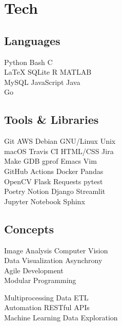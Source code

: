 \documentclass[]{jidicula-resume}
\begin{document}
\section{Tech}
\begin{minipage}[t]{.32\textwidth}
  \subsection{Languages}
  Python \textbullet{} Bash \textbullet{} C \\
  \LaTeX{} \textbullet{} SQLite \textbullet{} R \textbullet{} MATLAB  \\
  MySQL \textbullet{} JavaScript \textbullet{} Java \\
  Go
  \sectionsep{}
\end{minipage}
\hfill
\begin{minipage}[t]{.32\textwidth}
  \subsection{Tools \& Libraries}
  Git \textbullet{} AWS \textbullet{} {Debian GNU/Linux} \textbullet{} Unix \\
  macOS \textbullet{} Travis CI \textbullet{} HTML/CSS \textbullet{} Jira \\
  Make \textbullet{} GDB \textbullet{} gprof \textbullet{} Emacs \textbullet{} Vim \\
  GitHub Actions \textbullet{} Docker \textbullet{} Pandas \\
  OpenCV \textbullet{} Flask \textbullet{} Requests \textbullet{} pytest \\
  Poetry \textbullet{} Notion \textbullet{} Django \textbullet{} Streamlit \\
  Jupyter Notebook \textbullet{} Sphinx
  \sectionsep{}
\end{minipage}
\hfill
\begin{minipage}[t]{.32\textwidth}
  \subsection{Concepts}
  Image Analysis \textbullet{} Computer Vision \\
  Data Visualization \textbullet{} Asynchrony \\
  Agile Development \\
  Modular Programming
  
  Multiprocessing \textbullet{} Data ETL \\
  Automation \textbullet{}  RESTful APIs \\
  Machine Learning \textbullet{} Data Exploration
  \sectionsep{}
\end{minipage}
\end{document}
